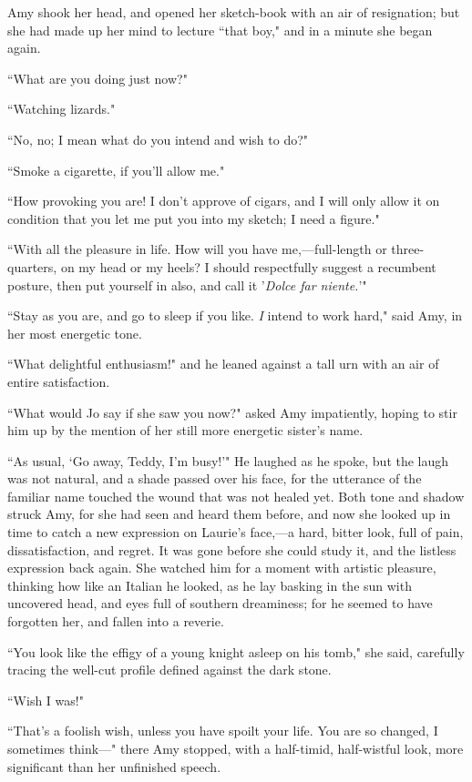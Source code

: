 Amy shook her head, and opened her sketch-book with an air of
resignation; but she had made up her mind to lecture ``that boy," and in
a minute she began again.

``What are you doing just now?"

``Watching lizards."

``No, no; I mean what do you intend and wish to do?"

``Smoke a cigarette, if you'll allow me."

``How provoking you are! I don't approve of cigars, and I
will only allow it on condition that you let me put you into my sketch;
I need a figure."

``With all the pleasure in life. How will you have me,---full-length or
three-quarters, on my head or my heels? I should respectfully suggest a
recumbent posture, then put yourself in also, and call it
'\emph{Dolce far niente.}'"

``Stay as you are, and go to sleep if you like. \emph{I} intend to work
hard," said Amy, in her most energetic tone.

``What delightful enthusiasm!" and he leaned against a tall urn with an
air of entire satisfaction.

``What would Jo say if she saw you now?" asked Amy impatiently, hoping to
stir him up by the mention of her still more energetic
sister's name.

``As usual, `Go away, Teddy, I'm
busy!'" He laughed as he spoke, but the laugh was not
natural, and a shade passed over his face, for the utterance of the
familiar name touched the wound that was not healed yet. Both tone and
shadow struck Amy, for she had seen and heard them before, and now she
looked up in time to catch a new expression on Laurie's
face,---a hard, bitter look, full of pain, dissatisfaction, and regret.
It was gone before she could study it, and the listless expression back
again. She watched him for a moment with artistic pleasure, thinking how
like an Italian he looked, as he lay basking in the sun with uncovered
head, and eyes full of southern dreaminess; for he seemed to have
forgotten her, and fallen into a reverie.

``You look like the effigy of a young knight asleep on his tomb," she
said, carefully tracing the well-cut profile defined against the dark
stone.

``Wish I was!"

``That's a foolish wish, unless you have spoilt your
life. You are so changed, I sometimes think---" there Amy stopped, with
a half-timid, half-wistful look, more significant than her unfinished
speech.


